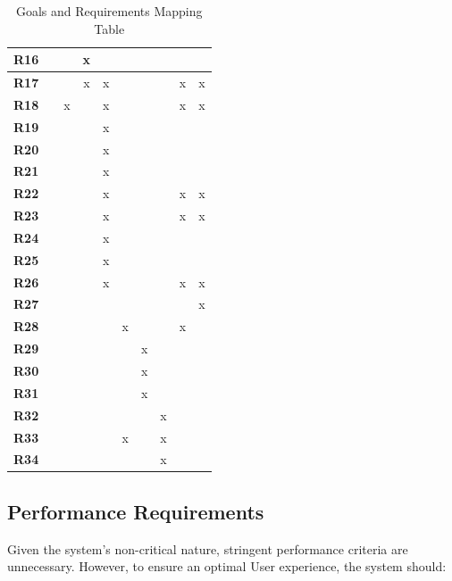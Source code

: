 \begin{table}[H]
\begin{tabular}{|c|c|c|c|c|c|c|c|c|c|}
        \textbf{R16} &   &   & x &   &   &   &   &   &   \\ \hline
        \textbf{R17} &   &   & x & x &   &   &   & x & x \\ \hline
        \textbf{R18} &   & x &   & x &   &   &   & x & x \\ \hline
        \textbf{R19} &   &   &   & x &   &   &   &   &   \\ \hline
        \textbf{R20} &   &   &   & x &   &   &   &   &   \\ \hline
        \textbf{R21} &   &   &   & x &   &   &   &   &   \\ \hline
        \textbf{R22} &   &   &   & x &   &   &   & x & x \\ \hline
        \textbf{R23} &   &   &   & x &   &   &   & x & x \\ \hline
        \textbf{R24} &   &   &   & x &   &   &   &   &   \\ \hline
        \textbf{R25} &   &   &   & x &   &   &   &   &   \\ \hline
        \textbf{R26} &   &   &   & x &   &   &   & x & x \\ \hline
        \textbf{R27} &   &   &   &   &   &   &   &   & x \\ \hline
        \textbf{R28} &   &   &   &   & x &   &   & x &   \\ \hline
        \textbf{R29} &   &   &   &   &   & x &   &   &   \\ \hline
        \textbf{R30} &   &   &   &   &   & x &   &   &   \\ \hline
        \textbf{R31} &   &   &   &   &   & x &   &   &   \\ \hline
        \textbf{R32} &   &   &   &   &   &   & x &   &   \\ \hline
        \textbf{R33} &   &   &   &   & x &   & x &   &   \\ \hline
        \textbf{R34} &   &   &   &   &   &   & x &   &   \\ \hline
    \end{tabular}
    \caption{Goals and Requirements Mapping Table}
    \label{tab:requirements_mapping}
\end{table}

\clearpage
\subsection{Performance Requirements}
 Given the system's non-critical nature, stringent performance criteria are unnecessary. However, to ensure an optimal User experience, the system should:

